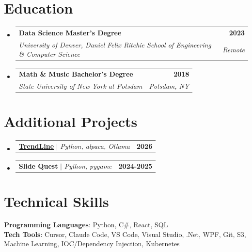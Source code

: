 \documentclass[letterpaper,11pt]{article}
\makeatletter
\newcommand{\projectDescription}[1]{
  \item\small{
    {#1 \vspace{-2pt}}
  }
}
\newcommand{\educationHeading}[4]{
  \vspace{-2pt}\item
    \begin{tabular*}{1.0\textwidth}[t]{l@{\extracolsep{\fill}}r}
      {\small\textbf{#1}} & {\small\textbf{#2}} \\
      {\small{\textsl{#3}}} & {\small{\textsl{#4}}} \\
    \end{tabular*}\vspace{-10pt}
}
\newcommand{\resumeProjectHeading}[2]{
    \item
    \begin{tabular*}{1.001\textwidth}{l@{\extracolsep{\fill}}r}
      \small#1 & \textbf{\small #2}\\
    \end{tabular*}\vspace{-6pt}
}
\newcommand{\resumeSubHeadingListStart}{\begin{itemize}[leftmargin=0.0in, label={}]}
\newcommand{\resumeSubHeadingListEnd}{\end{itemize}}
\makeatother
\begin{document}
\section{Education}
\resumeSubHeadingListStart
  \educationHeading
    {Data Science Master's Degree}{2023}
    {University of Denver, Daniel Felix Ritchie School of Engineering \& Computer Science}{Remote}
  \educationHeading
    {Math \& Music Bachelor's Degree}{2018}
    {State University of New York at Potsdam}{Potsdam, NY}
\resumeSubHeadingListEnd

\section{Additional Projects}
    \vspace{-5pt}
      \resumeSubHeadingListStart
          \resumeProjectHeading
          {\textbf{\href{https://trendline.schmidlin.casa}{TrendLine}} $|$ \emph{Python, alpaca, Ollama}}{2026}
            \vspace{-13pt}
      \resumeProjectHeading
          {\textbf{Slide Quest} $|$ \emph{Python, pygame}}{2024-2025}
          \vspace{-13pt}
    \resumeSubHeadingListEnd
\vspace{-8pt}


%
\section{Technical Skills}
 \begin{itemize}[leftmargin=0.15in, label={}]
    \small{\item{
     \textbf{Programming Languages}{: Python, C\#, React, SQL} \\
     \textbf{Tech Tools}{: Cursor, Claude Code, VS Code, Visual Studio, .Net, WPF, Git, S3, Machine Learning, IOC/Dependency Injection, Kubernetes} \\
    }}
 \end{itemize}
 \vspace{-16pt}
\end{document}
